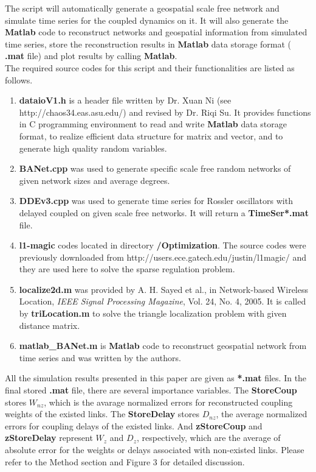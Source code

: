 \documentclass[onecolumn,aps,superscriptaddress,preprint]{revtex4}
\begin{document}
\noindent
The script will automatically generate a geospatial scale free network and
simulate time series for the coupled dynamics on it. It will also generate the
{\bf Matlab} code to reconstruct networks and geospatial information from
simulated time series, store the reconstruction results in {\bf Matlab} data
storage format ( {\bf *.mat} file) and plot results by calling {\bf Matlab}.\\

\noindent
The required source codes for this script and their functionalities are listed as follows. \\
\begin{enumerate}
\item {\bf dataioV1.h} is a header file written by Dr. Xuan Ni (see
http://chaos34.eas.asu.edu/) and revised by Dr. Riqi Su. It provides functions
in C programming environment to read and write {\bf Matlab} data storage format,
to realize efficient data structure for matrix and vector, and to generate high
quality random variables.

\item  {\bf BANet.cpp} was used to generate specific scale free random networks of given
network sizes and average degrees.

\item  {\bf DDEv3.cpp} was used to generate time series for Rossler oscillators with delayed
coupled on given scale free networks. It will return a {\bf TimeSer*.mat} file.

\item {\bf l1-magic} codes located in directory {\bf /Optimization}. The source
codes were previously downloaded from
http://users.ece.gatech.edu/justin/l1magic/ and they are used here to solve the
sparse regulation problem. 

\item {\bf localize2d.m} was provided by A. H. Sayed et al., in Network-based
Wireless Location, {\it IEEE Signal Processing Magazine}, Vol. 24, No. 4, 2005.
It is called by {\bf triLocation.m} to solve the triangle localization problem
with given distance matrix.

\item {\bf matlab\_BANet.m} is {\bf Matlab} code to reconstruct geospatial
network from time series and was written by the authors.

\end{enumerate}

\noindent
All the simulation results presented in this paper are given as {\bf
*.mat} files. In the final stored {\bf *.mat} file, there are several importance variables.
The {\bf StoreCoup} stores $W_{nz}$, which is the avarage normalized errors for
reconstructed coupling weights of the existed links. The {\bf StoreDelay} stores
$D_{nz}$, the average normalized errors for coupling delays of the existed
links. And {\bf zStoreCoup} and {\bf zStoreDelay} represent $W_{z}$ and $D_{z}$,
respectively, which are the average of absolute error for the weights or delays
associated with non-existed links. Please refer to the Method section and Figure
3 for detailed discussion.\\
 
\end{document}

